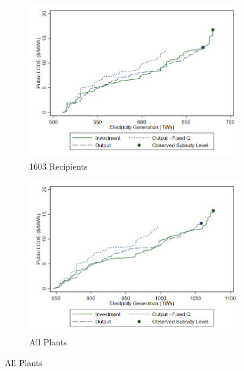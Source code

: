 \documentclass[12pt]{article}
\begin{document}
\begin{figure}[htb]
  \caption{Hypothetical Public LCOE vs Electricity Generation by Subsidy Type \label{fig:pub_lcoe_meanprice}}
  \begin{center}%
  \begin{subfigure}[b]{0.495\textwidth}
    \caption{1603 Recipients \label{fig:pub_lcoe_1603_meanprice}}
    \includegraphics[width=\textwidth]{plcoe_plot_1603plants_meanprice.png}
  \end{subfigure} \hfill
  \begin{subfigure}[b]{0.495\textwidth}
    \caption{All Plants \label{fig:pub_lcoe_all_meanprice}}
    \includegraphics[width=\textwidth]{plcoe_plot_all_meanprice.png}
  \end{subfigure}

\end{center}
\end{figure}
\end{document}
